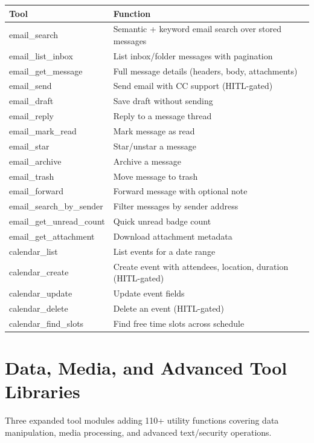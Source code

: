 \documentclass[12pt,a4paper,twoside]{report}
\begin{document}
\begin{longtable}{|l|X|}
\hline
\rowcolor{phiblue!20}
\textbf{Tool} & \textbf{Function} \\
\hline
\endhead
email\_search & Semantic + keyword email search over stored messages \\
\hline
email\_list\_inbox & List inbox/folder messages with pagination \\
\hline
email\_get\_message & Full message details (headers, body, attachments) \\
\hline
email\_send & Send email with CC support (HITL-gated) \\
\hline
email\_draft & Save draft without sending \\
\hline
email\_reply & Reply to a message thread \\
\hline
email\_mark\_read & Mark message as read \\
\hline
email\_star & Star/unstar a message \\
\hline
email\_archive & Archive a message \\
\hline
email\_trash & Move message to trash \\
\hline
email\_forward & Forward message with optional note \\
\hline
email\_search\_by\_sender & Filter messages by sender address \\
\hline
email\_get\_unread\_count & Quick unread badge count \\
\hline
email\_get\_attachment & Download attachment metadata \\
\hline
calendar\_list & List events for a date range \\
\hline
calendar\_create & Create event with attendees, location, duration (HITL-gated) \\
\hline
calendar\_update & Update event fields \\
\hline
calendar\_delete & Delete an event (HITL-gated) \\
\hline
calendar\_find\_slots & Find free time slots across schedule \\
\hline
\end{longtable}

\section{Data, Media, and Advanced Tool Libraries}

Three expanded tool modules adding 110+ utility functions covering data manipulation, media processing, and advanced text/security operations.
\end{document}
